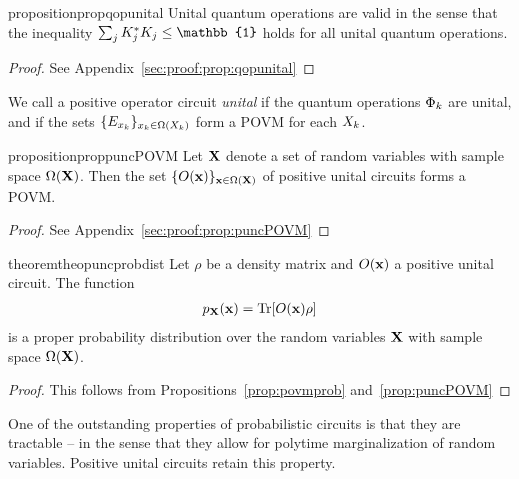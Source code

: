 \begin{restatable}{proposition}{propqopunital}
	\label{prop:qopunital}
	Unital quantum operations are valid in the sense that the inequality $\sum_j \kraus_{j}^* \kraus_{j} \leq \mathbb{1}$ holds for all unital quantum operations.
\end{restatable}

\begin{proof}
	See Appendix~\ref{sec:proof:prop:qopunital}
\end{proof}


\begin{definition}
	We call a positive operator circuit \textit{unital} if the quantum operations $\Phi_k$ are unital, and if the sets $\{ E_{x_k} \}_{x_k \in \Omega(X_k)}$ form a POVM for each $X_k$.
\end{definition}


\begin{restatable}{proposition}{proppuncPOVM}
	\label{prop:puncPOVM}
	Let $\mathbf{X}$ denote a set of random variables with sample space $\Omega(\mathbf{X})$.
	Then the set $\{ O(\mathbf{x})\}_{\mathbf{x} \in \Omega(\mathbf{X})}$ of positive unital circuits forms a POVM.
\end{restatable}

\begin{proof}
	See Appendix~\ref{sec:proof:prop:puncPOVM}
\end{proof}




\begin{restatable}{theorem}{theopuncprobdist}
	\label{theo:puncprobdist}
	Let $\rho$ be a density matrix and $O(\mathbf{x})$ a positive unital circuit. The function
	\begin{align}
		p_{\mathbf{X}}(\mathbf{x}) = \Tr [O(\mathbf{x}) \rho]
		\label{eq:theo:prob_operator}
	\end{align}
	is a proper probability distribution over the random variables $\mathbf{X}$ with sample space $\Omega(\mathbf{X})$.
\end{restatable}

\begin{proof}
	This follows from Propositions~\ref{prop:povmprob} and~\ref{prop:puncPOVM}
\end{proof}

One of the outstanding properties of probabilistic circuits is that they are tractable -- in the sense that they allow for polytime marginalization of random variables. Positive unital circuits retain this property.

